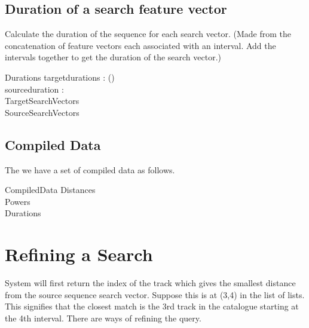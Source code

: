 \documentclass[11pt]{article}
\begin{document}
\subsection{Duration of a search feature vector}

Calculate the duration of the sequence for each search vector. (Made from the concatenation of feature vectors each associated with an interval. Add the intervals together to get the duration of the search vector.)

\begin{schema}{Durations}
	targetdurations : \seq (\seq \R) \\
	sourceduration : \R \\
	TargetSearchVectors  \\
	SourceSearchVectors \\
\end{schema}

\subsection{Compiled Data}

The we have a set of compiled data as follows. 

\begin{schema}{CompiledData}
	Distances \\
	Powers \\
	Durations \\
\end{schema}

\section{Refining a Search}
\label{s:refining}

System will first return the index of the track which gives the smallest distance from the source sequence search vector. Suppose this is at (3,4) in the list of lists. This signifies that the closest match is the 3rd track in the catalogue starting at the 4th interval. There are ways of refining the query. 
\end{document}
